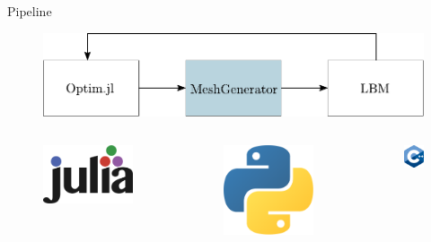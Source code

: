 \documentclass[aspectratio=169,xcolor=dvipsnames]{beamer}
\begin{document}
\begin{frame}{Pipeline}
	\addtocounter{framenumber}{-1}
	\begin{figure}
		\includegraphics[width=0.9\linewidth, trim={0 -0.1cm 0 0}, clip]{Images/pipeline2.pdf}
	\end{figure}
	\vspace{-2mm}
	\begin{columns}[T] %
		\begin{column}{.31\textwidth}
			\begin{figure}
				\includegraphics[width=0.5\linewidth, trim={0 0 0 0}, clip]{Images/julia.png}
			\end{figure}
		\end{column}%
		\begin{column}{.31\textwidth}
			\begin{figure}
				\includegraphics[width=0.35\linewidth, trim={0 0 0 0cm}, clip]{Images/python.png}
			\end{figure}
		\end{column}%
		\begin{column}{.31\textwidth}
			\begin{figure}
				\includegraphics[width=0.35\linewidth, trim={0 0 0 0cm}, clip]{Images/cpp.png}
			\end{figure}
		\end{column}%
	\end{columns}
\end{frame}
\end{document}
